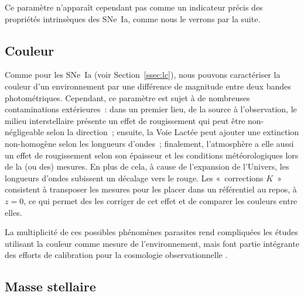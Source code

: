\documentclass[../main/main.tex]{subfiles}
\begin{document}
Ce paramètre n'apparaît cependant pas comme un indicateur précis des propriétés
intrinsèques des SNe~Ia, comme nous le verrons par la suite.

\subsection{Couleur}\label{ssec:chost}

Comme pour les SNe~Ia (voir Section~\ref{ssec:lc}), nous pouvons caractériser la
couleur d'un environnement par une différence de magnitude entre deux bandes
photométriques. Cependant, ce paramètre est sujet à de nombreuses contaminations
extérieures~: dans un premier lieu, de la source à l'observation, le milieu
interstellaire présente un effet de rougissement qui peut être non-négligeable
selon la direction~; ensuite, la Voie Lactée peut ajouter une extinction
non-homogène selon les longueurs d'ondes~; finalement, l'atmosphère a elle aussi
un effet de rougissement selon son épaisseur et les conditions météorologiques
lors de la (ou des) mesures. En plus de cela, à cause de l'expansion de
l'Univers, les longueurs d'ondes subissent un décalage vers le rouge. Les
«~corrections $K$~» consistent à transposer les mesures pour les placer dans un
référentiel au repos, à $z=0$, ce qui permet des les corriger de cet effet et de
comparer les couleurs entre elles.

La multiplicité de ces possibles phénomènes parasites rend compliquées les
études utilisant la couleur comme mesure de l'environnement, mais font partie
intégrante des efforts de calibration pour la cosmologie observationnelle
\citep{fitzpatrick1999, schlafly2011, popovic2021b}.

\subsection{Masse stellaire}\label{ssec:mhost}
\end{document}
